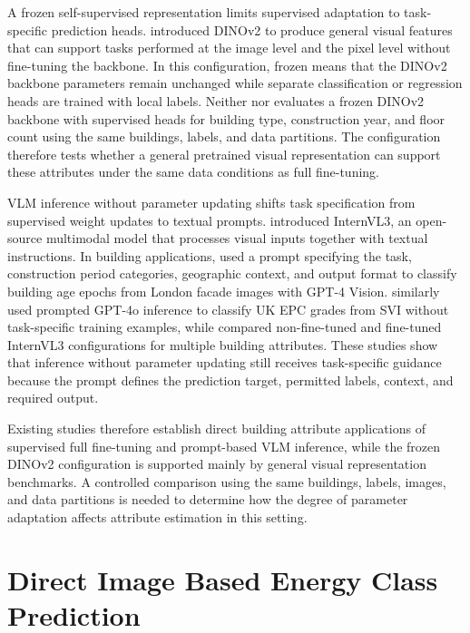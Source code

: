 A frozen self-supervised representation limits supervised adaptation to task-specific prediction heads. \textcite{oquab2023} introduced DINOv2 to produce general visual features that can support tasks performed at the image level and the pixel level without fine-tuning the backbone. In this configuration, frozen means that the DINOv2 backbone parameters remain unchanged while separate classification or regression heads are trained with local labels. Neither \textcite{liang2025} nor \textcite{zeng2024} evaluates a frozen DINOv2 backbone with supervised heads for building type, construction year, and floor count using the same buildings, labels, and data partitions. The configuration therefore tests whether a general pretrained visual representation can support these attributes under the same data conditions as full fine-tuning.

\Ac{VLM} inference without parameter updating shifts task specification from supervised weight updates to textual prompts. \textcite{zhu2025} introduced InternVL3, an open-source multimodal model that processes visual inputs together with textual instructions. In building applications, \textcite{zeng2024} used a prompt specifying the task, construction period categories, geographic context, and output format to classify building age epochs from London facade images with GPT-4 Vision. \textcite{pan_nd} similarly used prompted GPT-4o inference to classify UK \ac{EPC} grades from \ac{SVI} without task-specific training examples, while \textcite{liang2025} compared non-fine-tuned and fine-tuned InternVL3 configurations for multiple building attributes. These studies show that inference without parameter updating still receives task-specific guidance because the prompt defines the prediction target, permitted labels, context, and required output.

Existing studies therefore establish direct building attribute applications of supervised full fine-tuning and prompt-based \ac{VLM} inference, while the frozen DINOv2 configuration is supported mainly by general visual representation benchmarks. A controlled comparison using the same buildings, labels, images, and data partitions is needed to determine how the degree of parameter adaptation affects attribute estimation in this setting.

\section{Direct Image Based Energy Class Prediction}
\label{sec:direct_image_energy_class}

